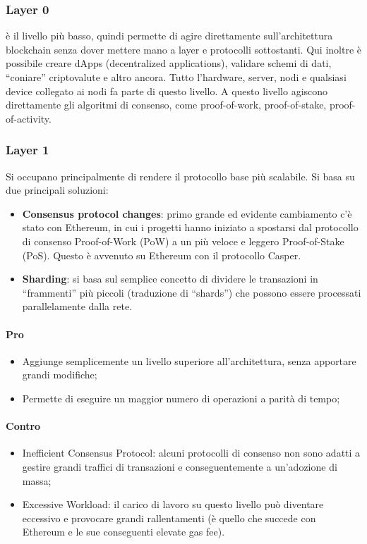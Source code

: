    \subsubsection{Layer 0}
    è il livello più basso, quindi permette di agire direttamente sull’architettura blockchain senza dover mettere mano a layer e protocolli sottostanti. 
    Qui inoltre è possibile creare dApps (decentralized applications), validare schemi di dati, “coniare” criptovalute e altro ancora.
    Tutto l’hardware, server, nodi e qualsiasi device collegato ai nodi fa parte di questo livello. 
    A questo livello agiscono direttamente gli algoritmi di consenso, come proof-of-work, proof-of-stake, proof-of-activity.

    \subsubsection{Layer 1}
    Si occupano principalmente di rendere il protocollo base più scalabile. Si basa su due principali soluzioni:
    \begin{itemize}
        \item \textbf{Consensus protocol changes}: primo grande ed evidente cambiamento c’è stato con Ethereum, in cui i progetti hanno iniziato a spostarsi 
        dal protocollo di consenso Proof-of-Work (PoW) a un più veloce e leggero Proof-of-Stake (PoS). Questo è avvenuto su Ethereum con il protocollo Casper.
        \item \textbf{Sharding}: si basa sul semplice concetto di dividere le transazioni in “frammenti” più piccoli (traduzione di “shards”) che possono essere 
        processati parallelamente dalla rete.
    \end{itemize}
    \paragraph{Pro}
    \begin{itemize}
        \item Aggiunge semplicemente un livello superiore all’architettura, senza apportare grandi modifiche;
        \item Permette di eseguire un maggior numero di operazioni a parità di tempo;
    \end{itemize}
    \paragraph{Contro}
    \begin{itemize}
        \item Inefficient Consensus Protocol: alcuni protocolli di consenso non sono adatti a gestire grandi traffici di transazioni e conseguentemente a un'adozione di massa;
        \item Excessive Workload: il carico di lavoro su questo livello può diventare eccessivo e provocare grandi rallentamenti (è quello che succede con Ethereum e le sue conseguenti
        elevate gas fee).        
    \end{itemize}

